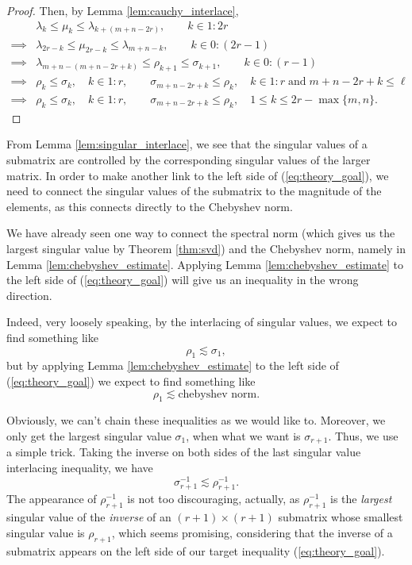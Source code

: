 \documentclass{article}
\begin{document}
\begin{proof}
		Then, by Lemma \ref{lem:cauchy_interlace},
		\begin{align}
			&\lambda_k \le \mu_k \le \lambda_{k+(m+n-2r)}, \qquad k \in 1:2r \\
			\implies&\lambda_{2r-k} \le \mu_{2r-k} \le \lambda_{m+n-k}, \qquad k \in 0:(2r-1) \\
			\implies&\lambda_{m+n -(m+n-2r+k)} \le \rho_{k+1} \le \sigma_{k+1}, \qquad k \in 0:(r-1) \\
			\implies&\rho_k \le \sigma_k, \quad k \in 1:r, \qquad \sigma_{m+n -2r+k} \le \rho_k, \quad k\in 1:r\;\text{and}\;m+n-2r+k \le \ell \\
			\implies&\rho_k \le \sigma_k, \quad k \in 1:r, \qquad \sigma_{m+n -2r+k} \le \rho_k, \quad 1\le k \le 2r-\max\{m,n\}.
		\end{align}
	\end{proof}
	
	From Lemma \ref{lem:singular_interlace}, we see that the singular values of a submatrix are controlled by the corresponding singular values of the larger matrix. In order to make another link to the left side of (\ref{eq:theory_goal}), we need to connect the singular values of the submatrix to the magnitude of the elements, as this connects directly to the Chebyshev norm.
	
	We have already seen one way to connect the spectral norm (which gives us the largest singular value by Theorem \ref{thm:svd}) and the Chebyshev norm, namely in Lemma \ref{lem:chebyshev_estimate}. Applying Lemma \ref{lem:chebyshev_estimate} to the left side of (\ref{eq:theory_goal}) will give us an inequality in the wrong direction.
	
	Indeed, very loosely speaking, by the interlacing of singular values, we expect to find something like
	\begin{equation}
		\rho_{1} \lesssim \sigma_{1},
	\end{equation}
	but by applying Lemma \ref{lem:chebyshev_estimate} to the left side of (\ref{eq:theory_goal}) we expect to find something like
	\begin{equation}
		\rho_{1} \lesssim \text{chebyshev norm}.
	\end{equation}
	
	Obviously, we can't chain these inequalities as we would like to. Moreover, we only get the largest singular value $\sigma_1$, when what we want is $\sigma_{r+1}$. Thus, we use a simple trick. Taking the inverse on both sides of the last singular value interlacing inequality, we have
	\begin{equation}
		\sigma_{r+1}^{-1} \lesssim \rho_{r+1}^{-1}.
	\end{equation}
	The appearance of $\rho_{r+1}^{-1}$ is not too discouraging, actually, as $\rho_{r+1}^{-1}$ is the \textit{largest} singular value of the \textit{inverse} of an $(r+1)\times (r+1)$ submatrix whose smallest singular value is $\rho_{r+1}$, which seems promising, considering that the inverse of a submatrix appears on the left side of our target inequality (\ref{eq:theory_goal}).
	
\end{document}

